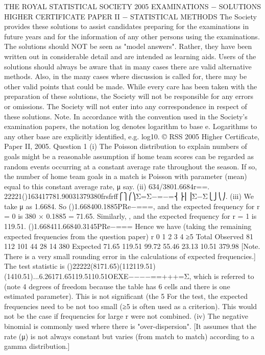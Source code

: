 THE ROYAL STATISTICAL SOCIETY
2005 EXAMINATIONS − SOLUTIONS
HIGHER CERTIFICATE
PAPER II − STATISTICAL METHODS
The Society provides these solutions to assist candidates preparing for the examinations in future years and for the information of any other persons using the examinations.
The solutions should NOT be seen as "model answers". Rather, they have been written out in considerable detail and are intended as learning aids.
Users of the solutions should always be aware that in many cases there are valid alternative methods. Also, in the many cases where discussion is called for, there may be other valid points that could be made.
While every care has been taken with the preparation of these solutions, the Society will not be responsible for any errors or omissions.
The Society will not enter into any correspondence in respect of these solutions.
Note. In accordance with the convention used in the Society's examination papers, the notation log denotes logarithm to base e. Logarithms to any other base are explicitly identified, e.g. log10.
© RSS 2005
Higher Certificate, Paper II, 2005. Question 1
(i) The Poisson distribution to explain numbers of goals might be a reasonable assumption if home team scores can be regarded as random events occurring at a constant average rate throughout the season. If so, the number of home team goals in a match is Poisson with parameter (mean) equal to this constant average rate, μ say.
(ii) 634/3801.6684r==.
22221()163417781.90031379380frsfrff⎧⎫⎛⎞Σ=Σ−=−=⎨⎬⎜⎟Σ−Σ⎩⎭⎝⎠.
(iii) We take μ as 1.6684. So ()1.668400.1885PRe−===, and the expected frequency for r = 0 is 380 × 0.1885 = 71.65.
Similarly, , and the expected frequency for r = 1 is 119.51. ()1.668411.66840.3145PRe−===
Hence we have (taking the remaining expected frequencies from the question paper)
r
0
1
2
3
4
≥5
Total
Observed
81
112
101
44
28
14
380
Expected
71.65
119.51
99.72
55.46
23.13
10.51
379.98
[Note. There is a very small rounding error in the calculations of expected frequencies.]
The test statistic is
()22222(8171.65)(112119.51)(1410.51)...6.26171.65119.5110.51OEXE−−−−==+++=Σ,
which is referred to (note 4 degrees of freedom because the table has 6 cells and there is one estimated parameter). This is not significant (the 5%
For the test, the expected frequencies need to be not too small (≥5 is often used as a criterion). This would not be the case if frequencies for large r were not combined.
(iv) The negative binomial is commonly used where there is "over-dispersion". [It assumes that the rate (μ) is not always constant but varies (from match to match) according to a gamma distribution.]
